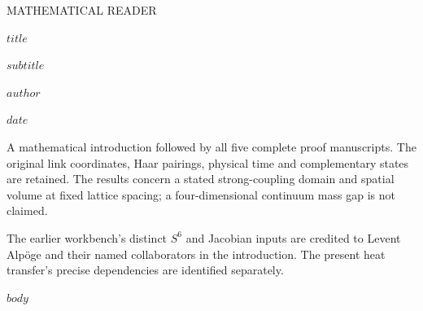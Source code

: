 \documentclass[11pt,a4paper]{article}
\renewcommand{\[}{\begingroup\small\originaldisplaystart}
\renewcommand{\]}{\originaldisplayend\endgroup}
\begin{document}
\begin{titlepage}
\vspace*{14mm}
{\sffamily\Large MATHEMATICAL READER\par}
\vspace{12mm}
{\LARGE\bfseries $title$\par}
\vspace{9mm}
{\large $subtitle$\par}
\vspace{13mm}
{\large $author$\par}
\vspace{3mm}
{$date$\par}
\vfill
\begin{minipage}{0.96\textwidth}
A mathematical introduction followed by all five complete proof manuscripts. The original link coordinates, Haar pairings, physical time and complementary states are retained. The results concern a stated strong-coupling domain and spatial volume at fixed lattice spacing; a four-dimensional continuum mass gap is not claimed.

\medskip
The earlier workbench's distinct \(S^6\) and Jacobian inputs are credited to Levent Alpöge and their named collaborators in the introduction. The present heat transfer's precise dependencies are identified separately.
\end{minipage}
\vspace{10mm}
\end{titlepage}
\tableofcontents
\clearpage
{}
$body$
\end{document}
